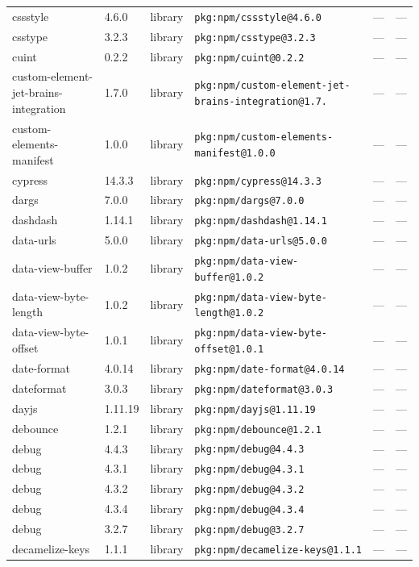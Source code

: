 \documentclass[11pt]{article}
\begin{document}
\begin{longtable}{|l|l|l|p{2.2cm}|l|p{4cm}|}
cssstyle & 4.6.0 & library & \texttt{pkg:npm/cssstyle@4.6.0} & — & — \\
csstype & 3.2.3 & library & \texttt{pkg:npm/csstype@3.2.3} & — & — \\
cuint & 0.2.2 & library & \texttt{pkg:npm/cuint@0.2.2} & — & — \\
custom-element-jet-brains-integration & 1.7.0 & library & \texttt{pkg:npm/custom-element-jet-brains-integration@1.7.} & — & — \\
custom-elements-manifest & 1.0.0 & library & \texttt{pkg:npm/custom-elements-manifest@1.0.0} & — & — \\
cypress & 14.3.3 & library & \texttt{pkg:npm/cypress@14.3.3} & — & — \\
dargs & 7.0.0 & library & \texttt{pkg:npm/dargs@7.0.0} & — & — \\
dashdash & 1.14.1 & library & \texttt{pkg:npm/dashdash@1.14.1} & — & — \\
data-urls & 5.0.0 & library & \texttt{pkg:npm/data-urls@5.0.0} & — & — \\
data-view-buffer & 1.0.2 & library & \texttt{pkg:npm/data-view-buffer@1.0.2} & — & — \\
data-view-byte-length & 1.0.2 & library & \texttt{pkg:npm/data-view-byte-length@1.0.2} & — & — \\
data-view-byte-offset & 1.0.1 & library & \texttt{pkg:npm/data-view-byte-offset@1.0.1} & — & — \\
date-format & 4.0.14 & library & \texttt{pkg:npm/date-format@4.0.14} & — & — \\
dateformat & 3.0.3 & library & \texttt{pkg:npm/dateformat@3.0.3} & — & — \\
dayjs & 1.11.19 & library & \texttt{pkg:npm/dayjs@1.11.19} & — & — \\
debounce & 1.2.1 & library & \texttt{pkg:npm/debounce@1.2.1} & — & — \\
debug & 4.4.3 & library & \texttt{pkg:npm/debug@4.4.3} & — & — \\
debug & 4.3.1 & library & \texttt{pkg:npm/debug@4.3.1} & — & — \\
debug & 4.3.2 & library & \texttt{pkg:npm/debug@4.3.2} & — & — \\
debug & 4.3.4 & library & \texttt{pkg:npm/debug@4.3.4} & — & — \\
debug & 3.2.7 & library & \texttt{pkg:npm/debug@3.2.7} & — & — \\
decamelize-keys & 1.1.1 & library & \texttt{pkg:npm/decamelize-keys@1.1.1} & — & — \\

\end{longtable}
\end{document}
